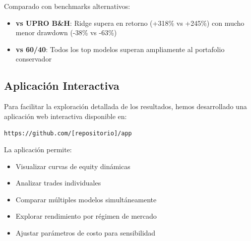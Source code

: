 Comparado con benchmarks alternativos:
\begin{itemize}
    \item \textbf{vs UPRO B\&H}: Ridge supera en retorno (+318\% vs +245\%) con mucho menor drawdown (-38\% vs -63\%)
    \item \textbf{vs 60/40}: Todos los top modelos superan ampliamente al portafolio conservador
\end{itemize}

\subsection{Aplicaci\'on Interactiva}
\label{subsec:interactive_app}

Para facilitar la exploraci\'on detallada de los resultados, hemos desarrollado una aplicaci\'on web interactiva disponible en:

\begin{center}
\texttt{https://github.com/[repositorio]/app}
\end{center}

La aplicaci\'on permite:
\begin{itemize}
    \item Visualizar curvas de equity din\'amicas
    \item Analizar trades individuales
    \item Comparar m\'ultiples modelos simult\'aneamente
    \item Explorar rendimiento por r\'egimen de mercado
    \item Ajustar par\'ametros de costo para sensibilidad
\end{itemize}
